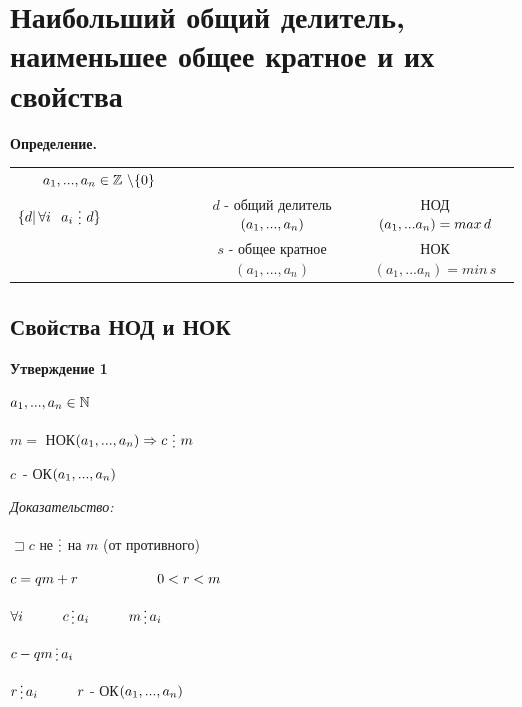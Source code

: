 \documentclass[12pt]{article}
\begin{document}
\section{Наибольший общий делитель, наименьшее общее кратное и их свойства}
\textbf{Определение.}\par
\begin{tabular}{ccc}
    $a_1,...,a_n \in \mathbb{Z} \, \, \backslash \{0\} \vspace{2 ex}$                                                                                                                                   \\
    $\{ d| \, \forall i \, \hspace{2 mm} a_i \, \mathop{\raisebox{-2pt}{\vdots}} \, d\} \hspace{2 cm}$ & $d$ - общий делитель$(a_1,...,a_n) \vspace{2 ex}$ & НОД$(a_1,...a_n) = max \, d \vspace{2 ex}$ \\
                                                                                                       & $s$ - общее кратное$(a_1,...,a_n)$                & НОК$(a_1,...a_n) = min \, s $              \\
\end{tabular}\par

\subsection{Свойства НОД и НОК}
\textbf{Утверждение 1}\par
$a_1,...,a_n \in \mathbb{N} \vspace{1 ex}$\par
$m =$ НОК$(a_1,...,a_n) \Rightarrow c\, \mathop{\raisebox{-2pt}{\vdots}} \,m$\par
$c \,$ - ОК$(a_1,...,a_n) \newline$\par
\textit{Доказательство:}\par
$\sqsupset c$ не $\mathop{\raisebox{-2pt}{\vdots}}$ на $m$ (от противного)\par
$c = qm+r \hspace{2 cm} 0 < r < m$\par
$\forall i \hspace{1 cm} c \mathop{\raisebox{-2pt}{\vdots}} a_i \hspace{1 cm} m \mathop{\raisebox{-2pt}{\vdots}} a_i$\par
$c-qm \mathop{\raisebox{-2pt}{\vdots}} a_i$\par
$r \mathop{\raisebox{-2pt}{\vdots}} a_i \hspace{1 cm} r$ - ОК$(a_1,...,a_n) \newline$\par
\end{document}
